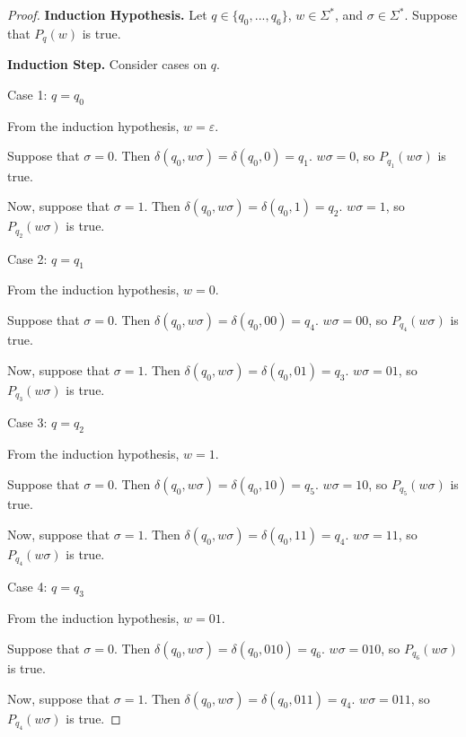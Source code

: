 \documentclass[11pt]{article}
\begin{document}
\begin{enumerate}[label=\textbf{Q\arabic*.}]
\begin{enumerate}[label=\textit{\alph*)}]
\begin{proof}
		\textbf{Induction Hypothesis.} Let \(q \in \{q_0, ..., q_6\}\), \(w \in \Sigma ^*\), and \(\sigma \in \Sigma ^*\). Suppose that \(P_{q}(w)\) is true.

		\medskip

		\textbf{Induction Step.} Consider cases on \(q\).

		Case 1: \(q=q_0\)

		From the induction hypothesis, \(w = \varepsilon\).
		
		Suppose that \(\sigma = 0\). Then \(\delta (q_0, w \sigma ) = \delta (q_0, 0) = q_1\). \(w \sigma = 0\), so \(P_{q_1}(w \sigma)\) is true.

		Now, suppose that \(\sigma = 1\). Then \(\delta (q_0, w \sigma) = \delta (q_0, 1) = q_2\). \(w \sigma = 1\), so \(P_{q_2}(w \sigma)\) is true.

		\smallskip

		Case 2: \(q=q_1\)

		From the induction hypothesis, \(w = 0\).
		
		Suppose that \(\sigma = 0\). Then \(\delta (q_0, w \sigma ) = \delta (q_0, 00) = q_4\). \(w \sigma = 00\), so \(P_{q_4}(w \sigma)\) is true.

		Now, suppose that \(\sigma = 1\). Then \(\delta (q_0, w \sigma) = \delta (q_0, 01) = q_3\). \(w \sigma = 01\), so \(P_{q_3}(w \sigma)\) is true.

		\smallskip

		Case 3: \(q=q_2\)

		From the induction hypothesis, \(w = 1\).
		
		Suppose that \(\sigma = 0\). Then \(\delta (q_0, w \sigma ) = \delta (q_0, 10) = q_5\). \(w \sigma = 10\), so \(P_{q_5}(w \sigma)\) is true.

		Now, suppose that \(\sigma = 1\). Then \(\delta (q_0, w \sigma) = \delta (q_0, 11) = q_4\). \(w \sigma = 11\), so \(P_{q_4}(w \sigma)\) is true.

		\smallskip

		Case 4: \(q=q_3\)

		From the induction hypothesis, \(w = 01\).
		
		Suppose that \(\sigma = 0\). Then \(\delta (q_0, w \sigma ) = \delta (q_0, 010) = q_6\). \(w \sigma = 010\), so \(P_{q_6}(w \sigma)\) is true.

		Now, suppose that \(\sigma = 1\). Then \(\delta (q_0, w \sigma) = \delta (q_0, 011) = q_4\). \(w \sigma = 011\), so \(P_{q_4}(w \sigma)\) is true.

		\smallskip


\end{proof}
\end{enumerate}
\end{enumerate}
\end{document}

